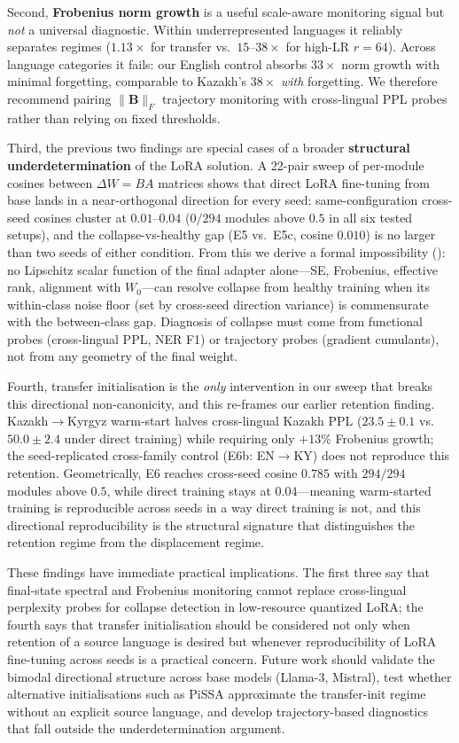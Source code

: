 \documentclass[11pt]{article}
\begin{document}
Second, \textbf{Frobenius norm growth} is a useful scale-aware monitoring signal but \emph{not} a universal diagnostic. Within underrepresented languages it reliably separates regimes ($1.13\times$ for transfer vs.\ $15$--$38\times$ for high-LR $r{=}64$). Across language categories it fails: our English control absorbs $33\times$ norm growth with minimal forgetting, comparable to Kazakh's $38\times$ \emph{with} forgetting. We therefore recommend pairing $\|\mathbf{B}\|_F$ trajectory monitoring with cross-lingual PPL probes rather than relying on fixed thresholds.

Third, the previous two findings are special cases of a broader \textbf{structural underdetermination} of the LoRA solution. A 22-pair sweep of per-module cosines between $\Delta W{=}BA$ matrices shows that direct LoRA fine-tuning from base lands in a near-orthogonal direction for every seed: same-configuration cross-seed cosines cluster at $0.01$--$0.04$ ($0/294$ modules above $0.5$ in all six tested setups), and the collapse-vs-healthy gap (E5 vs.\ E5c, cosine $0.010$) is no larger than two seeds of either condition. From this we derive a formal impossibility (): no Lipschitz scalar function of the final adapter alone---SE, Frobenius, effective rank, alignment with $W_0$---can resolve collapse from healthy training when its within-class noise floor (set by cross-seed direction variance) is commensurate with the between-class gap. Diagnosis of collapse must come from functional probes (cross-lingual PPL, NER F1) or trajectory probes (gradient cumulants), not from any geometry of the final weight.

Fourth, transfer initialisation is the \emph{only} intervention in our sweep that breaks this directional non-canonicity, and this re-frames our earlier retention finding. Kazakh$\rightarrow$Kyrgyz warm-start halves cross-lingual Kazakh PPL ($23.5 \pm 0.1$ vs.\ $50.0 \pm 2.4$ under direct training) while requiring only $+13\%$ Frobenius growth; the seed-replicated cross-family control (E6b: EN$\rightarrow$KY) does not reproduce this retention. Geometrically, E6 reaches cross-seed cosine $0.785$ with $294/294$ modules above $0.5$, while direct training stays at $0.04$---meaning warm-started training is reproducible across seeds in a way direct training is not, and this directional reproducibility is the structural signature that distinguishes the retention regime from the displacement regime.

These findings have immediate practical implications. The first three say that final-state spectral and Frobenius monitoring cannot replace cross-lingual perplexity probes for collapse detection in low-resource quantized LoRA; the fourth says that transfer initialisation should be considered not only when retention of a source language is desired but whenever reproducibility of LoRA fine-tuning across seeds is a practical concern. Future work should validate the bimodal directional structure across base models (Llama-3, Mistral), test whether alternative initialisations such as PiSSA \cite{meng2024pissa} approximate the transfer-init regime without an explicit source language, and develop trajectory-based diagnostics that fall outside the underdetermination argument.
\end{document}
